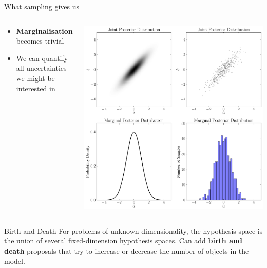\begin{frame}[t]{What sampling gives us}
\begin{columns}[T]
\begin{column}{0.35\textwidth}
  \vspace{30pt}
  \begin{itemize}
  \setlength{\itemsep}{20pt}
  \item {\bf Marginalisation} becomes trivial
  \item We can quantify all uncertainties we might be interested in
  \end{itemize}
\end{column}
\hfill
\begin{column}{0.5\textwidth}
  \hspace{-30pt}
  \includegraphics[scale=0.25]{marginalisation.pdf}
\end{column}

\end{columns}
\end{frame}

\begin{frame}[t]{Birth and Death}
For problems of unknown dimensionality, the hypothesis space is the union
of several fixed-dimension hypothesis spaces. Can add {\bf birth and death}
proposals that try to increase or decrease the number of objects in the model.


\end{frame}




